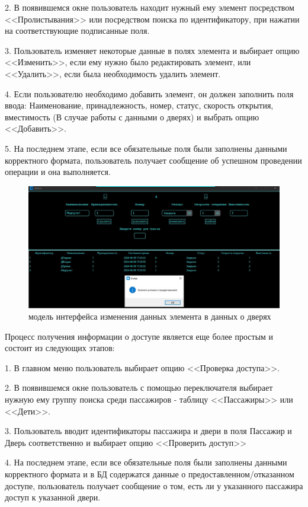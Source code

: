 2. В появившемся окне пользователь находит нужный ему элемент посредством <<Пролистывания>> или посредством поиска по идентификатору, при нажатии на соответствующие подписанные поля.

3. Пользователь изменяет некоторые данные в полях элемента и выбирает опцию <<Изменить>>, если ему нужно было редактировать элемент, или <<Удалить>>, если была необходимость удалить элемент.

4. Если пользователю необходимо добавить элемент, он должен заполнить поля ввода: Наименование, принадлежность, номер, статус, скорость открытия, вместимость (В случае работы с данными о дверях) и выбрать опцию <<Добавить>>.

5. На последнем этапе, если все обязательные поля были заполнены данными корректного формата, пользователь получает сообщение об успешном проведении операции и она выполняется.

\begin{figure} [ht]
	\centering
	\includegraphics[width=1\linewidth]{images/Example1}
	\caption{модель интерфейса изменения данных элемента в данных о дверях}
	\label{fig:example1}
\end{figure}
Процесс получения информации о доступе является еще более простым и состоит из следующих этапов:

1. В главном меню пользователь выбирает опцию <<Проверка доступа>>.

2. В появившемся окне пользователь с помощью переключателя выбирает нужную ему группу поиска среди пассажиров - таблицу <<Пассажиры>> или <<Дети>>.

3. Пользователь вводит идентификаторы пассажира и двери в поля \textquotedbl Пассажир \textquotedbl и \textquotedbl Дверь \textquotedbl соответственно и выбирает опцию <<Проверить доступ>>

4. На последнем этапе, если все обязательные поля были заполнены данными корректного формата и в БД содержатся данные о предоставленном/отказанном доступе, пользователь получает сообщение о том, есть ли у указанного пассажира доступ к указанной двери.

